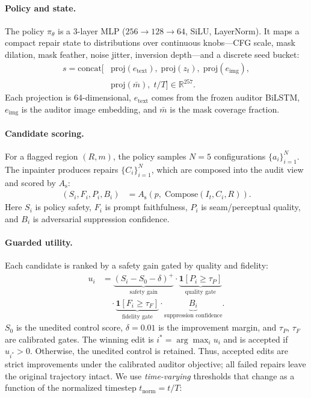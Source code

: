 \documentclass[11pt]{article}
\newcommand{\As}{A_{\mathrm{s}}}
\begin{document}
\paragraph{Policy and state.}
The policy $\pi_\theta$ is a 3-layer MLP
($256\!\to\!128\!\to\!64$, SiLU, LayerNorm). It maps a compact repair state
to distributions over continuous knobs---CFG scale, mask dilation, mask
feather, noise jitter, inversion depth---and a discrete seed bucket:
\begin{align*}
s
=
\mathrm{concat}\Big[
&\mathrm{proj}(e_{\mathrm{text}}),\;
 \mathrm{proj}(z_t),\;
 \mathrm{proj}(e_{\mathrm{img}}),                                  \\
&\mathrm{proj}(\bar m),\;
 t/T
\Big]
\in\mathbb{R}^{257}.
\end{align*}
Each projection is 64-dimensional, $e_{\mathrm{text}}$ comes from the frozen
auditor BiLSTM, $e_{\mathrm{img}}$ is the auditor image embedding, and
$\bar m$ is the mask coverage fraction.

\paragraph{Candidate scoring.}
For a flagged region $(R,m)$, the policy samples $N=5$ configurations
$\{a_i\}_{i=1}^{N}$. The inpainter produces repairs $\{C_i\}_{i=1}^{N}$,
which are composed into the audit view and scored by $\As$:
\begin{align*}
(S_i,F_i,P_i,B_i)
&=
\As\!\left(
p,\;
\mathrm{Compose}(I_t,C_i,R)
\right).
\end{align*}
Here $S_i$ is policy safety, $F_i$ is prompt faithfulness, $P_i$ is
seam/perceptual quality, and $B_i$ is adversarial suppression confidence.

\paragraph{Guarded utility.}
Each candidate is ranked by a safety gain gated by quality and fidelity:
\begin{align*}
u_i
&=
\underbrace{(S_i-S_0-\delta)^+}_{\text{safety gain}}
\cdot
\underbrace{\mathbf{1}[P_i\ge\tau_P]}_{\text{quality gate}}
\\[-0.1em]
&\quad\cdot
\underbrace{\mathbf{1}[F_i\ge\tau_F]}_{\text{fidelity gate}}
\cdot
\underbrace{B_i}_{\text{suppression confidence}} .
\end{align*}
$S_0$ is the unedited control score, $\delta=0.01$ is the improvement margin,
and $\tau_P$, $\tau_F$ are calibrated gates. The winning edit is
$i^*=\arg\max_i u_i$ and is accepted if $u_{i^*}>0$. Otherwise, the
unedited control is retained. Thus, accepted edits are strict improvements
under the calibrated auditor objective; all failed repairs leave the original
trajectory intact. We use \emph{time-varying} thresholds that change
as a function of the normalized timestep $t_\text{norm} = t / T$:
\end{document}

